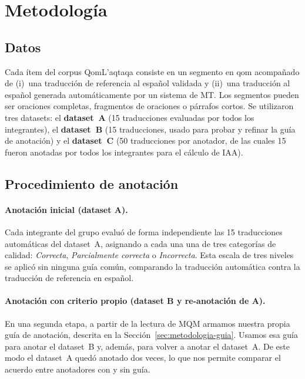 \section{Metodología}
\label{sec:metodologia}

\subsection{Datos}
\label{sec:metodologia-datos}
Cada ítem del corpus QomL'aqtaqa consiste en un segmento en qom acompañado
de (i)~una traducción de referencia al español validada y (ii)~una traducción al
español generada automáticamente por un sistema de MT. Los segmentos pueden ser
oraciones completas, fragmentos de oraciones o párrafos cortos. Se utilizaron tres
datasets: el \textbf{dataset~A} (15 traducciones evaluadas por todos los
integrantes), el \textbf{dataset~B} (15 traducciones, usado para probar y refinar
la guía de anotación) y el \textbf{dataset~C} (50 traducciones por anotador, de
las cuales 15 fueron anotadas por todos los integrantes para el cálculo de IAA).

\subsection{Procedimiento de anotación}
\label{sec:metodologia-anotacion}

\paragraph{Anotación inicial (dataset A).}
Cada integrante del grupo evaluó de forma independiente las 15 traducciones
automáticas del dataset~A, asignando a cada una una de tres categorías de
calidad: \emph{Correcta}, \emph{Parcialmente correcta} o \emph{Incorrecta}. Esta
escala de tres niveles se aplicó sin ninguna guía común, comparando la
traducción automática contra la traducción de referencia en español.

\paragraph{Anotación con criterio propio (dataset B y re-anotación de A).}
En una segunda etapa, a partir de la lectura de MQM \citep{lommel2014mqm} armamos
nuestra propia guía de anotación, descrita en la
Sección~\ref{sec:metodologia-guia}. Usamos esa guía para anotar el dataset~B y,
además, para volver a anotar el dataset~A. De este modo el dataset~A quedó
anotado dos veces, lo que nos permite comparar el acuerdo entre anotadores con y sin guía.


